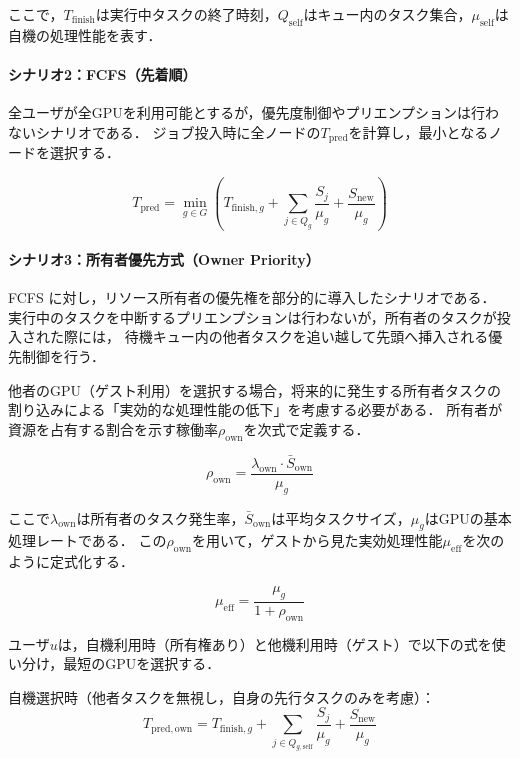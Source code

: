 \documentclass[12pt,a4paper]{jsarticle}
\begin{document}
ここで，$T_\mathrm{finish}$は実行中タスクの終了時刻，$Q_\mathrm{self}$はキュー内のタスク集合，$\mu_\mathrm{self}$は自機の処理性能を表す．

\paragraph{シナリオ2：FCFS（先着順）}
全ユーザが全GPUを利用可能とするが，優先度制御やプリエンプションは行わないシナリオである．
ジョブ投入時に全ノードの$T_\mathrm{pred}$を計算し，最小となるノードを選択する．

\begin{equation}
  T_\mathrm{pred} = \min_{g \in G} \left( T_{\mathrm{finish},g} + \sum_{j \in Q_g} \frac{S_j}{\mu_g} + \frac{S_\mathrm{new}}{\mu_g} \right)
  \label{eq:fcfs}
\end{equation}

\paragraph{シナリオ3：所有者優先方式（Owner Priority）}
FCFS に対し，リソース所有者の優先権を部分的に導入したシナリオである．
実行中のタスクを中断するプリエンプションは行わないが，所有者のタスクが投入された際には，
待機キュー内の他者タスクを追い越して先頭へ挿入される優先制御を行う．

他者のGPU（ゲスト利用）を選択する場合，将来的に発生する所有者タスクの割り込みによる「実効的な処理性能の低下」を考慮する必要がある．
所有者が資源を占有する割合を示す稼働率$\rho_\mathrm{own}$を次式で定義する．

\begin{equation}
  \rho_\mathrm{own} = \frac{\lambda_\mathrm{own} \cdot \bar{S}_\mathrm{own}}{\mu_g}
  \label{eq:rho}
\end{equation}

ここで$\lambda_\mathrm{own}$は所有者のタスク発生率，$\bar{S}_\mathrm{own}$は平均タスクサイズ，$\mu_g$はGPUの基本処理レートである．
この$\rho_\mathrm{own}$を用いて，ゲストから見た実効処理性能$\mu_\mathrm{eff}$を次のように定式化する．

\begin{equation}
  \mu_\mathrm{eff} = \frac{\mu_g}{1 + \rho_\mathrm{own}}
  \label{eq:mu_eff}
\end{equation}

ユーザ$u$は，自機利用時（所有権あり）と他機利用時（ゲスト）で以下の式を使い分け，最短のGPUを選択する．

自機選択時（他者タスクを無視し，自身の先行タスクのみを考慮）：
\begin{equation}
  T_{\mathrm{pred,own}} = T_{\mathrm{finish},g} + \sum_{j \in Q_{g,\mathrm{self}}} \frac{S_j}{\mu_g} + \frac{S_\mathrm{new}}{\mu_g}
  \label{eq:own_select}
\end{equation}
\end{document}
